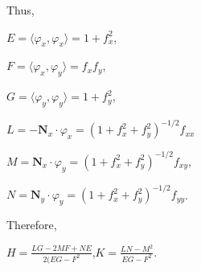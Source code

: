 \documentclass[12pt, a4paper]{article}
\begin{document}
\begin{flushleft}
    Thus,\par
    
\vspace{4mm}

        \centerline{$E=\langle\varphi_x,\varphi_x\rangle=1+f^2_x$,}
        
\vspace{2mm}

        \centerline{$F=\langle\varphi_x,\varphi_y\rangle=f_xf_y$,}
        
\vspace{2mm}

        \centerline{$G=\langle\varphi_y,\varphi_y\rangle=1+f^2_y$,}
        
\vspace{2mm}

        \centerline{$L=-\mathbf{N}_x\cdot\varphi_x=(1+f^2_x+f^2_y)^{-1/2}f_{xx}$}
        
\vspace{2mm}

        \centerline{$M=\mathbf{N}_x\cdot\varphi_{y}=(1+f^2_x+f^2_y)^{-1/2}f_{xy}$,}
        
\vspace{2mm}

        \centerline{$N=\mathbf{N}_y\cdot\varphi_y=(1+f^2_x+f^2_y)^{-1/2}f_{yy}$.}
        
\vspace{4mm}

    Therefore,\par
    
\vspace{4mm}

        \centerline{$H=\frac{LG-2MF+NE}{2(EG-F^2}$,\hspace{5mm}$K=\frac{LN-M^2}{EG-F^2}$.}


\end{flushleft}
\end{document}
